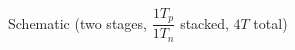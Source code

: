 \begin{center}
    Schematic (two stages, $\dfrac{1T_{p}}{1T_{n}}$ stacked, $4T$ total)
    \begin{figure}[h] %
        \begin{center}
            \begin{circuitdiagram}{24}{15}
            \end{circuitdiagram}
        \end{center}
    \end{figure}
\end{center}
